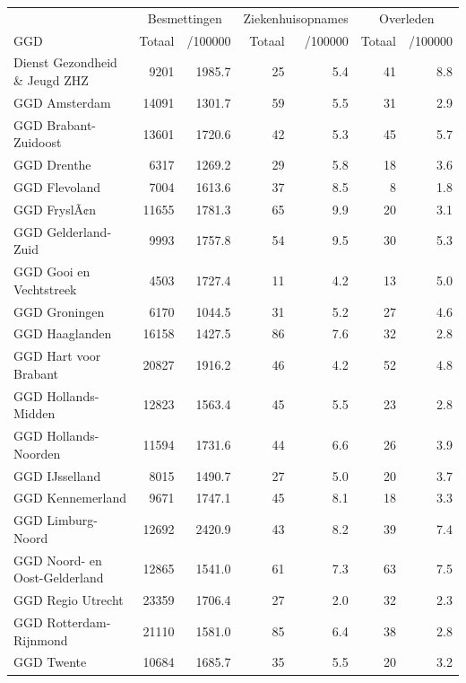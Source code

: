 \documentclass[
  english,
  man,floatsintext]{apa6}
\begin{document}
\begin{table}
\centering\begingroup\fontsize{10}{12}\selectfont

\begin{threeparttable}
\begin{tabular}{lrrrrrr}
\toprule
\multicolumn{1}{c}{ } & \multicolumn{2}{c}{Besmettingen} & \multicolumn{2}{c}{Ziekenhuisopnames} & \multicolumn{2}{c}{Overleden} \\
\cmidrule(l{3pt}r{3pt}){2-3} \cmidrule(l{3pt}r{3pt}){4-5} \cmidrule(l{3pt}r{3pt}){6-7}
GGD & Totaal & /100000 & Totaal & /100000 & Totaal & /100000\\
\midrule
Dienst Gezondheid \& Jeugd ZHZ & 9201 & 1985.7 & 25 & 5.4 & 41 & 8.8\\
GGD Amsterdam & 14091 & 1301.7 & 59 & 5.5 & 31 & 2.9\\
GGD Brabant-Zuidoost & 13601 & 1720.6 & 42 & 5.3 & 45 & 5.7\\
GGD Drenthe & 6317 & 1269.2 & 29 & 5.8 & 18 & 3.6\\
GGD Flevoland & 7004 & 1613.6 & 37 & 8.5 & 8 & 1.8\\
GGD FryslÃ¢n & 11655 & 1781.3 & 65 & 9.9 & 20 & 3.1\\
GGD Gelderland-Zuid & 9993 & 1757.8 & 54 & 9.5 & 30 & 5.3\\
GGD Gooi en Vechtstreek & 4503 & 1727.4 & 11 & 4.2 & 13 & 5.0\\
GGD Groningen & 6170 & 1044.5 & 31 & 5.2 & 27 & 4.6\\
GGD Haaglanden & 16158 & 1427.5 & 86 & 7.6 & 32 & 2.8\\
GGD Hart voor Brabant & 20827 & 1916.2 & 46 & 4.2 & 52 & 4.8\\
GGD Hollands-Midden & 12823 & 1563.4 & 45 & 5.5 & 23 & 2.8\\
GGD Hollands-Noorden & 11594 & 1731.6 & 44 & 6.6 & 26 & 3.9\\
GGD IJsselland & 8015 & 1490.7 & 27 & 5.0 & 20 & 3.7\\
GGD Kennemerland & 9671 & 1747.1 & 45 & 8.1 & 18 & 3.3\\
GGD Limburg-Noord & 12692 & 2420.9 & 43 & 8.2 & 39 & 7.4\\
GGD Noord- en Oost-Gelderland & 12865 & 1541.0 & 61 & 7.3 & 63 & 7.5\\
GGD Regio Utrecht & 23359 & 1706.4 & 27 & 2.0 & 32 & 2.3\\
GGD Rotterdam-Rijnmond & 21110 & 1581.0 & 85 & 6.4 & 38 & 2.8\\
GGD Twente & 10684 & 1685.7 & 35 & 5.5 & 20 & 3.2\\

\end{tabular}
\end{threeparttable}
\end{table}
\end{document}
